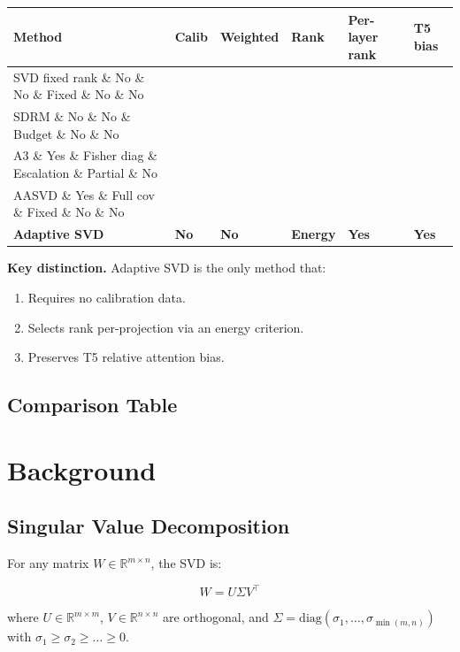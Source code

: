 \begin{table}[H]
\centering
\small
\begin{tabular}{llllll}
\toprule
\textbf{Method} & \textbf{Calib} & \textbf{Weighted} & \textbf{Rank} & \textbf{Per-layer rank} & \textbf{T5 bias} \\
\midrule
SVD fixed rank \& No \& No \& Fixed \& No \& No \\
SDRM \& No \& No \& Budget \& No \& No \\
A3 \& Yes \& Fisher diag \& Escalation \& Partial \& No \\
AASVD \& Yes \& Full cov \& Fixed \& No \& No \\
\textbf{Adaptive SVD} & \textbf{No} & \textbf{No} & \textbf{Energy} & \textbf{Yes} & \textbf{Yes} \\
\bottomrule
\end{tabular}
\end{table}

\textbf{Key distinction.} Adaptive SVD is the only method that:
\begin{enumerate}
\item Requires no calibration data.
\item Selects rank per-projection via an energy criterion.
\item Preserves T5 relative attention bias.

\end{enumerate}
\subsection{Comparison Table}



\section{Background}

\subsection{Singular Value Decomposition}

For any matrix $W \in \mathbb{R}^{m \times n}$, the SVD is:

\[
W = U \Sigma V^\top
\tag{3.1}
\]

where $U \in \mathbb{R}^{m \times m}$, $V \in \mathbb{R}^{n \times n}$ are 
orthogonal, and $\Sigma = \mathrm{diag}(\sigma_1, \dots, \sigma_{\min(m,n)})$ 
with $\sigma_1 \geq \sigma_2 \geq \dots \geq 0$.

